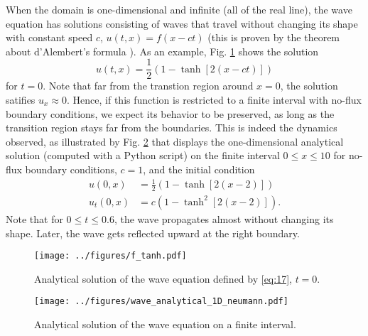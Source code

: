 \documentclass[11pt]{article}
\begin{document}
When the domain is one-dimensional and infinite (all of the real line), the wave equation has solutions consisting of waves that travel without changing its shape with constant speed $c$, $u(t,x) = f(x-ct)$ (this is proven by the theorem about d'Alembert's formula \cite{olver2014introduction}).  As an example, Fig. \ref{fig:f_tanh} shows the solution
\begin{equation}
  \label{eq:17}
  u(t,x) = \frac{1}{2}\left(1-\tanh[2(x-ct)]\right)
\end{equation}
for $t=0$. Note that far from the transtion region around $x=0$, the solution satifies $u_x \approx 0$. Hence, if this function is restricted to a finite interval with no-flux boundary conditions, we expect its behavior to be preserved, as long as the transition region stays far from the boundaries. This is indeed the dynamics observed, as illustrated by Fig. \ref{fig:1D_neumann} that displays the one-dimensional analytical solution (computed with a Python script) on the finite interval $0 \le x \le 10$ for no-flux boundary conditions, $c=1$, and the initial condition
\begin{subequations}
  \label{eq:icond}
\begin{align}
  u(0,x) &= \frac{1}{2}\left(1-\tanh[2(x-2)]\right) \\
  u_t(0,x) &= c\left(1-\tanh^2[2(x-2)]\right).
\end{align}  
\end{subequations}
Note that for $0 \le t \le 0.6$, the wave propagates almost without changing its shape. Later, the wave gets reflected upward at the right boundary.
\begin{figure}[h]
  \centering
    \texttt{[image: ../figures/f\_tanh.pdf]} 
  \caption{\label{fig:f_tanh} Analytical solution of the wave equation defined by \eqref{eq:17}, $t=0$.}
\end{figure}

\begin{figure}[h]
  \centering
    \texttt{[image: ../figures/wave\_analytical\_1D\_neumann.pdf]} 
  \caption{\label{fig:1D_neumann} Analytical solution of the wave equation on a finite interval.}
\end{figure}
\end{document}
